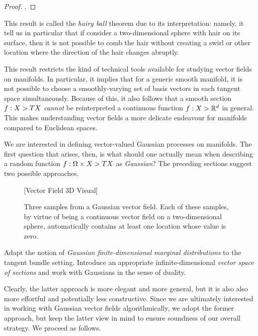 \documentclass[11pt]{book}
\begin{document}
\begin{proof}
\textcite[Theorem 13.32]{lee10}.
\end{proof}

This result is called the \emph{hairy ball} theorem due to its interpretation: namely, it tell us in particular that if consider a two-dimensional sphere with hair on its surface, then it is not possible to comb the hair without creating a swirl or other location where the direction of the hair changes abruptly.

This result restricts the kind of technical tools available for studying vector fields on manifolds.
In particular, it implies that for a generic smooth manifold, it is not possible to choose a smoothly-varying set of basis vectors in each tangent space simultaneously.
Because of this, it also follows that a smooth section $f : X \-> TX$ \emph{cannot} be reinterpreted a continuous function $f : X \-> \mathbb{R}^d$ in general.
This makes understanding vector fields a more delicate endeavour for manifolds compared to Euclidean spaces.

We are interested in defining vector-valued Gaussian processes on manifolds.
The first question that arises, then, is what should one actually mean when describing a random function $f : \Omega \times X \-> TX$ as \emph{Gaussian}?
The preceding sections suggest two possible approaches.

\begin{figure}
\vspace*{10ex}
[Vector Field 3D Visual]
\vspace*{10ex}
\caption{Three samples from a Gaussian vector field. Each of these samples, by virtue of being a continuous vector field on a two-dimensional sphere, automatically contains at least one location whose value is zero.}
\label{fig:gvf}
\end{figure}

\1 Adapt the notion of \emph{Gaussian finite-dimensional marginal distributions} to the tangent bundle setting.
\2 Introduce an appropriate infinite-dimensional \emph{vector space of sections} and work with Gaussians in the sense of duality.
\0 

Clearly, the latter approach is more elegant and more general, but it is also also more effortful and potentially less constructive.
Since we are ultimately interested in working with Gaussian vector fields algorithmically, we adopt the former approach, but keep the latter view in mind to ensure soundness of our overall strategy.
We proceed as follows.
\end{document}

